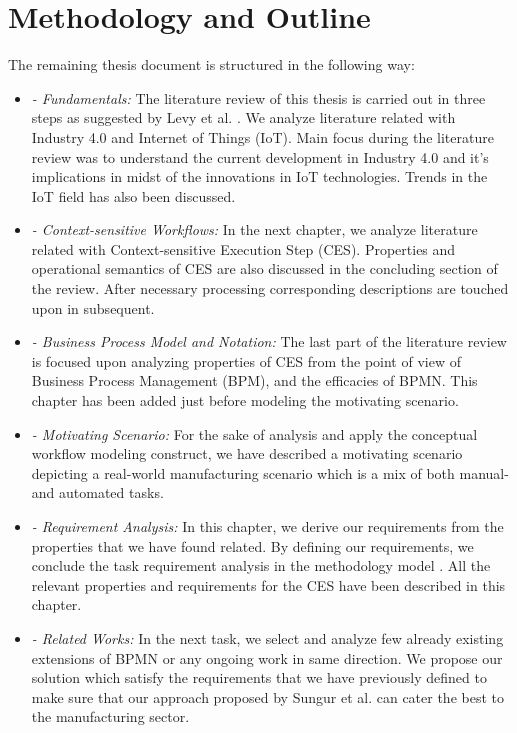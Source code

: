 \section{Methodology and Outline}
The remaining thesis document is structured in the following way:
\begin{itemize}
	\item \textit{ - Fundamentals:} The literature review of this thesis is carried out in three steps as suggested by Levy et al. \cite{LEVYLIT}. We analyze literature related with Industry 4.0 and Internet of Things ({\acs{IoT}}). Main focus during the literature review was to understand the current development in Industry 4.0 and it's implications in midst of the innovations in \acs{IoT} technologies. Trends in the \acs{IoT} field has also been discussed. 
	\item \textit{ - Context-sensitive Workflows:} In the next chapter, we analyze literature related with Context-sensitive Execution Step (\acs{CES}). Properties and operational semantics of \acs{CES} are also discussed in the concluding section of the review. After necessary processing corresponding descriptions are touched upon in subsequent.
	\item \textit{ - Business Process Model and Notation:} The last part of the literature review is focused upon analyzing properties of \acs{CES} from the point of view of Business Process Management (\acs{BPM}), and the efficacies of \acs{BPMN}. This chapter has been added just before modeling the motivating scenario.
	\item \textit{ - Motivating Scenario:} For the sake of analysis and apply the conceptual workflow modeling construct, we have described a motivating scenario depicting a real-world manufacturing scenario which is a mix of both manual- and automated tasks.
	\item \textit{ - Requirement Analysis:} In this chapter, we derive our requirements from the properties that we have found related. By defining our requirements, we conclude the task requirement analysis in the methodology model . All the relevant properties and requirements for the \acs{CES} have been described in this chapter.
	\item \textit{ - Related Works:} In the next task, we select and analyze few already existing extensions of \acs{BPMN} or any ongoing work in same direction. We propose our solution which satisfy the requirements that we have previously defined to make sure that our approach proposed by Sungur et al. \cite{TIMURCIRP} can cater the best to the manufacturing sector.

\end{itemize}
